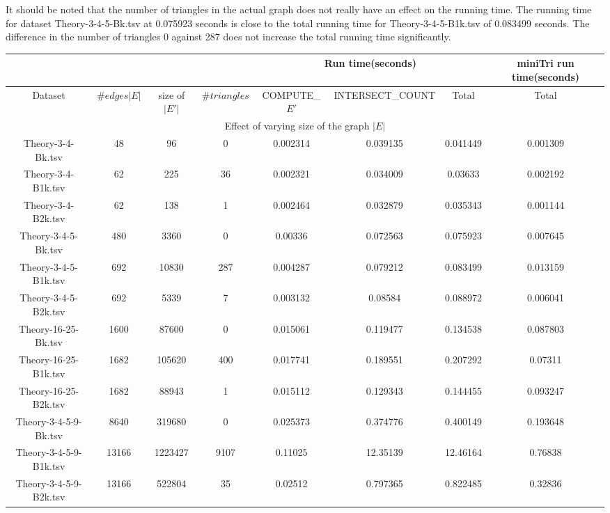 \documentclass[conference]{IEEEtran}
\begin{document}
It should be noted that the number of triangles in the actual graph does not really have an effect on the running time. The running time for dataset Theory-3-4-5-Bk.tsv at 0.075923 seconds is close to the total running time for Theory-3-4-5-B1k.tsv of 0.083499 seconds. The difference in the number of triangles 0 against 287 does not increase the total running time significantly.

\begin{table*}[ht]
\centering
 \begin{tabular}{|c || c | c | c || c | c | c || c |} 
 \hline
 \multicolumn{4}{|c||}{}&\multicolumn{3}{|c||}{Run time(seconds)}&\multicolumn{1}{|c|}{miniTri run time(seconds)} \\
 \hline
 Dataset & $\#edges |E|$ & size of $|E'|$ & $\#triangles$ & COMPUTE\_$E'$ & INTERSECT\_COUNT & Total & Total \\ [0.5ex] 
 \hline
 \multicolumn{8}{c}{Effect of varying size of the graph $|E|$} \\
 \hline
 Theory-3-4-Bk.tsv & 48 & 96 & 0 & 0.002314 & 0.039135 & 0.041449 & 0.001309 \\
 \hline
 Theory-3-4-B1k.tsv & 62 & 225 & 36 & 0.002321 & 0.034009 & 0.03633 & 0.002192 \\
 \hline
 Theory-3-4-B2k.tsv & 62 & 138 & 1 & 0.002464 & 0.032879 & 0.035343 & 0.001144 \\
 \hline
 Theory-3-4-5-Bk.tsv & 480 & 3360 & 0 & 0.00336 & 0.072563 & 0.075923 & 0.007645 \\
 \hline
 Theory-3-4-5-B1k.tsv & 692 & 10830 & 287 & 0.004287 & 0.079212 & 0.083499 & 0.013159 \\
 \hline
 Theory-3-4-5-B2k.tsv & 692 & 5339 & 7 & 0.003132 & 0.08584 & 0.088972 & 0.006041 \\
 \hline
 Theory-16-25-Bk.tsv & 1600 & 87600 & 0 & 0.015061 & 0.119477 & 0.134538 & 0.087803 \\
 \hline
 Theory-16-25-B1k.tsv & 1682 & 105620 & 400 & 0.017741 & 0.189551 & 0.207292 & 0.07311 \\
 \hline
 Theory-16-25-B2k.tsv & 1682 & 88943 & 1 & 0.015112 & 0.129343 & 0.144455 & 0.093247 \\
 \hline
 Theory-3-4-5-9-Bk.tsv & 8640 & 319680 & 0 & 0.025373 & 0.374776 & 0.400149 & 0.193648 \\
 \hline
 Theory-3-4-5-9-B1k.tsv & 13166 & 1223427 & 9107 & 0.11025 & 12.35139 & 12.46164 & 0.76838 \\
 \hline
 Theory-3-4-5-9-B2k.tsv & 13166 & 522804 & 35 & 0.02512 & 0.797365 & 0.822485 & 0.32836 \\

\end{tabular}
\end{table*}
\end{document}
